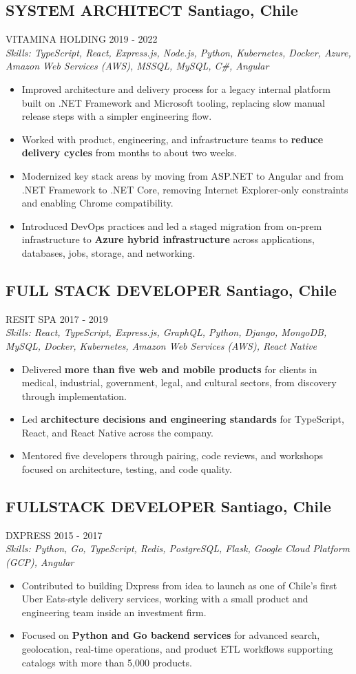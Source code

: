 \documentclass{article}
\newcommand{\WorkExperience}[2]{
   \subsection*{#1}
   \vspace{-1em}
   \uppercase{#2}
}
\newcommand{\Skills}[1]{
   \textit{Skills: #1}
}
\begin{document}
\WorkExperience{SYSTEM ARCHITECT \hfill Santiago, Chile}{Vitamina Holding \hfill 2019 {-} 2022} \\
\Skills{TypeScript, React, Express.js, Node.js, Python, Kubernetes, Docker, Azure, Amazon Web Services (AWS), MSSQL, MySQL, C\#, Angular}
\begin{itemize}
\item Improved architecture and delivery process for a legacy internal platform built on .NET Framework and Microsoft tooling, replacing slow manual release steps with a simpler engineering flow.
\item Worked with product, engineering, and infrastructure teams to \textbf{reduce delivery cycles} from months to about two weeks.
\item Modernized key stack areas by moving from ASP.NET to Angular and from .NET Framework to .NET Core, removing Internet Explorer-only constraints and enabling Chrome compatibility.
\item Introduced DevOps practices and led a staged migration from on-prem infrastructure to \textbf{Azure hybrid infrastructure} across applications, databases, jobs, storage, and networking.
\end{itemize}


\WorkExperience{FULL STACK DEVELOPER \hfill Santiago, Chile}{Resit SPA \hfill 2017 {-} 2019} \\
\Skills{React, TypeScript, Express.js, GraphQL, Python, Django, MongoDB, MySQL, Docker, Kubernetes, Amazon Web Services (AWS), React Native}
\begin{itemize}
\item Delivered \textbf{more than five web and mobile products} for clients in medical, industrial, government, legal, and cultural sectors, from discovery through implementation.
\item Led \textbf{architecture decisions and engineering standards} for TypeScript, React, and React Native across the company.
\item Mentored five developers through pairing, code reviews, and workshops focused on architecture, testing, and code quality.
\end{itemize}

\WorkExperience{FULLSTACK DEVELOPER \hfill Santiago, Chile}{Dxpress \hfill 2015 {-} 2017} \\
\Skills{Python, Go, TypeScript, Redis, PostgreSQL, Flask, Google Cloud Platform (GCP), Angular}
\begin{itemize}
\item Contributed to building Dxpress from idea to launch as one of Chile's first Uber Eats-style delivery services, working with a small product and engineering team inside an investment firm.
\item Focused on \textbf{Python and Go backend services} for advanced search, geolocation, real-time operations, and product ETL workflows supporting catalogs with more than 5,000 products.
\end{itemize}
\end{document}
